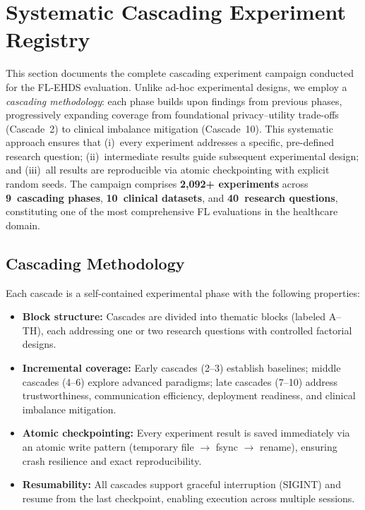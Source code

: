 \documentclass[conference]{IEEEtran}
\begin{document}
\clearpage
\section{Systematic Cascading Experiment Registry}
\label{sec:cascade_registry}

This section documents the complete cascading experiment campaign conducted for the FL-EHDS evaluation. Unlike ad-hoc experimental designs, we employ a \textit{cascading methodology}: each phase builds upon findings from previous phases, progressively expanding coverage from foundational privacy--utility trade-offs (Cascade~2) to clinical imbalance mitigation (Cascade~10). This systematic approach ensures that (i)~every experiment addresses a specific, pre-defined research question; (ii)~intermediate results guide subsequent experimental design; and (iii)~all results are reproducible via atomic checkpointing with explicit random seeds. The campaign comprises \textbf{2,092+ experiments} across \textbf{9~cascading phases}, \textbf{10~clinical datasets}, and \textbf{40~research questions}, constituting one of the most comprehensive FL evaluations in the healthcare domain.

\subsection{Cascading Methodology}

Each cascade is a self-contained experimental phase with the following properties:

\begin{itemize}
    \item \textbf{Block structure:} Cascades are divided into thematic blocks (labeled A--TH), each addressing one or two research questions with controlled factorial designs.
    \item \textbf{Incremental coverage:} Early cascades (2--3) establish baselines; middle cascades (4--6) explore advanced paradigms; late cascades (7--10) address trustworthiness, communication efficiency, deployment readiness, and clinical imbalance mitigation.
    \item \textbf{Atomic checkpointing:} Every experiment result is saved immediately via an atomic write pattern (temporary file $\to$ fsync $\to$ rename), ensuring crash resilience and exact reproducibility.
    \item \textbf{Resumability:} All cascades support graceful interruption (SIGINT) and resume from the last checkpoint, enabling execution across multiple sessions.
\end{itemize}
\end{document}
